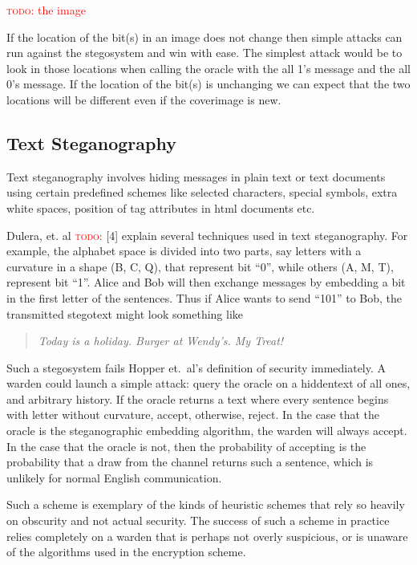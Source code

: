 \documentclass[11pt]{article}
\newcommand\todo[1]{\textcolor{red}{\textsc{todo}: #1}}
\begin{document}
\todo{the image}

If the location of the bit(s) in an image does not change then simple
attacks can run against the stegosystem and win with ease. The
simplest attack would be to look in those locations when calling the
oracle with  the all 1's message and the all 0's message. If the
location of the bit(s) is unchanging we can expect that the two
locations will be different even if the coverimage is new.

\subsection{Text Steganography}
\label{sub:text_steganography}
Text steganography involves hiding messages in plain text or text
documents using certain predefined schemes like selected characters,
special symbols, extra white spaces, position of tag attributes in
html documents etc. 

Dulera, et. al \todo{}[4] explain several techniques used in text
steganography. For example, the alphabet space is divided into two
parts, say letters with a curvature in a shape (B, C, Q), that
represent bit ``0'', while others (A, M, T), represent bit ``1''. Alice
and Bob will then exchange messages by embedding a bit in the first
letter of the sentences. Thus if Alice wants to send ``101'' to Bob, the
transmitted stegotext might look something like

\begin{quote}
  \itshape Today is a holiday. Burger at Wendy's. My Treat!
\end{quote}

Such a stegosystem fails Hopper et.\ al's definition of security
immediately. A warden could launch a simple attack: query the oracle
on a hiddentext of all ones, and arbitrary history. If the oracle
returns a text where every sentence begins with letter without
curvature, accept, otherwise, reject. In the case that the oracle is
the steganographic embedding algorithm, the warden will always accept.
In the case that the oracle is not, then the probability of accepting
is the probability that a draw from the channel returns such a
sentence, which is unlikely for normal English communication.

Such a scheme is exemplary of the kinds of heuristic schemes that rely
so heavily on obscurity and not actual security. The success of such a
scheme in practice relies completely on a warden that is perhaps not
overly suspicious, or is unaware of the algorithms used in the
encryption scheme.
\end{document}
